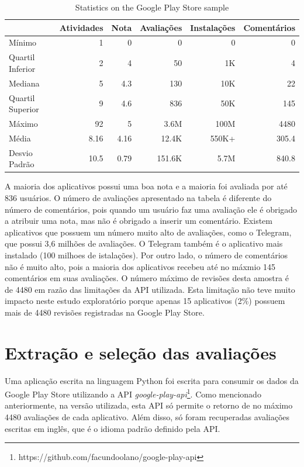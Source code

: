 \begin{table}[htb]

\centering
\caption{Statistics on the Google Play Store sample}
\small
\label{tab:summarygps}
\begin{tabular}{lrrrrr}
\hline
             & Atividades & Nota & Avaliações     & Instalações  & Comentários \\
\hline
Mínimo          & 1          & 0     & 0            & 0         & 0       \\
Quartil Inferior           & 2          & 4           & 50    & 1K      & 4       \\
Mediana       & 5          & 4.3   & 130         & 10K     & 22      \\
Quartil Superior          & 9          & 4.6   & 836        & 50K     & 145     \\
Máximo          & 92         & 5     & 3.6M    & 100M & 4480    \\
Média         & 8.16       & 4.16  & 12.4K     & 550K+    & 305.4   \\
Desvio Padrão        & 10.5       & 0.79  & 151.6K  & 5.7M   & 840.8  \\
\hline
\end{tabular}
\end{table}

A maioria dos aplicativos possui uma boa nota e a maioria foi avaliada por até 836 usuários. O número de avaliações apresentado na tabela é diferente do número de comentários, pois quando um usuário faz uma avaliação ele é obrigado a atribuir uma nota, mas não é obrigado a inserir um comentário. Existem aplicativos que possuem um número muito alto de avaliações, como o Telegram, que possui 3,6 milhões de avaliações. O Telegram também é o aplicativo mais instalado (100 milhoes de istalações).
Por outro lado, o número de comentários não é muito alto, pois a maioria dos aplicativos recebeu até no máxmio 145 comentários em suas avaliações. O número máximo de revisões desta amostra é de 4480 em razão das limitações da API utilizada. Esta limitação não teve muito impacto neste estudo exploratório porque apenas 15 aplicativos (2\%) possuem mais de 4480 revisões registradas na Google Play Store.


\section{Extração e seleção das avaliações}

Uma aplicação escrita na linguagem Python foi escrita para consumir os dados da Google Play Store utilizando a API \emph{google-play-api}\footnote{https://github.com/facundoolano/google-play-api}. Como mencionado anteriormente, na versão utilizada, esta API só permite o retorno de no máximo 4480 avaliações de cada aplicativo. Além disso, só foram recuperadas avaliações escritas em inglês, que é o idioma padrão definido pela API.


